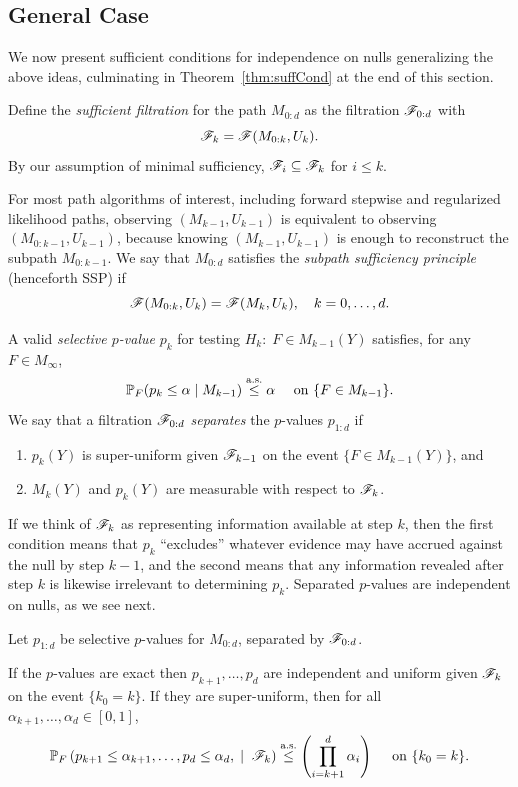 \documentclass{article}
\begin{document}
\subsection{General Case}


We now present sufficient conditions for independence on nulls generalizing the above ideas, culminating in Theorem~\ref{thm:suffCond} at the end of this section.

Define the {\em sufficient filtration} for the path $M_{0:d}$ as the filtration $\mathscr{F}_{0:d}$ with 
\[
\mathscr{F}_k = \mathscr{F}(M_{0:k}, U_k).
\]
By our assumption of minimal sufficiency, $\mathscr{F}_i \subseteq \mathscr{F}_k$ for $i\leq k$.

For most path algorithms of interest, including forward stepwise and regularized likelihood paths, observing $(M_{k-1}, U_{k-1})$ is equivalent to observing $(M_{0:k-1},U_{k-1})$, because knowing $(M_{k-1}, U_{k-1})$ is enough to  reconstruct the subpath $M_{0:k-1}$. We say that $M_{0:d}$ satisfies the {\em subpath sufficiency principle} (henceforth SSP) if \begin{equation}\label{eq:SSP}
  \mathscr{F}(M_{0:k}, U_k) = \mathscr{F}(M_k, U_k), \quad k=0,\ldots, d.
\end{equation}

A valid {\em selective $p$-value} $p_k$ for testing $H_k:\; F \in M_{k-1}(Y)$ satisfies, for any $F\in M_{\infty}$,
\[
\mathbb{P}_F(p_k \leq \alpha \mid M_{k-1}) \overset{\textrm{a.s.}}{\leq} \alpha \quad \text{ on } \{F\in M_{k-1}\}.
\]
We say that a filtration $\mathscr{F}_{0:d}$ {\em separates} the $p$-values $p_{1:d}$ if
\begin{enumerate}
\item $p_k(Y)$ is super-uniform given $\mathscr{F}_{k-1}$ on the event $\{F\in M_{k-1}(Y)\}$, and
\item $M_k(Y)$ and $p_k(Y)$ are measurable with respect to $\mathscr{F}_k$.
\end{enumerate}

If we think of $\mathscr{F}_k$ as representing information available at step $k$, then the first condition means that $p_k$ ``excludes'' whatever evidence may have accrued against the null by step $k-1$, and the second means that any information revealed after step $k$ is likewise irrelevant to determining $p_k$. Separated $p$-values are independent on nulls, as we see next.

\begin{proposition}\label{prop:jointConserv}

  Let $p_{1:d}$ be selective $p$-values for $M_{0:d}$, 
  separated by $\mathscr{F}_{0:d}$.

  If the $p$-values are exact then $p_{k+1}, \ldots, p_d$ are
  independent and uniform given $\mathscr{F}_k$ on the event $\{k_0=k\}$.
  If they are super-uniform, then for all
  $\alpha_{k+1},\ldots,\alpha_d \in [0,1]$,
  \begin{equation}\label{eq:jointSuper}
  \mathbb{P}_F\left(p_{k+1}\leq \alpha_{k+1}, \ldots, p_d \leq \alpha_d, \;
    \mid\; \mathscr{F}_k\right) \overset{\textrm{a.s.}}{\leq} \left(\prod_{i=k+1}^d
  \alpha_i\right) \quad \text{ on } \{k_0 = k\}.
  \end{equation}
\end{proposition}
\end{document}
